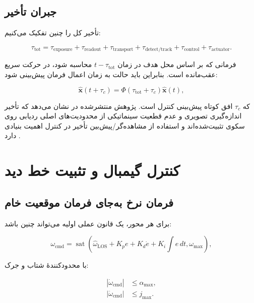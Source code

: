\documentclass[12pt,a4paper]{article}
\newcommand{\EN}[1]{\lr{#1}}
\begin{document}
\subsection{جبران تأخیر}

تأخیر کل را چنین تفکیک می‌کنیم:

\begin{equation}
\tau_{\mathrm{tot}} =
\tau_{\mathrm{exposure}}+
\tau_{\mathrm{readout}}+
\tau_{\mathrm{transport}}+
\tau_{\mathrm{detect/track}}+
\tau_{\mathrm{control}}+
\tau_{\mathrm{actuator}}.
\end{equation}

فرمانی که بر اساس محل هدف در زمان $t-\tau_{\mathrm{tot}}$ محاسبه شود، در حرکت سریع عقب‌مانده است. بنابراین باید حالت به زمان اعمال فرمان پیش‌بینی شود:

\begin{equation}
\widehat{\mathbf{x}}(t+\tau_c)=
\Phi(\tau_{\mathrm{tot}}+\tau_c)\widehat{\mathbf{x}}(t),
\end{equation}

که $\tau_c$ افق کوتاه پیش‌بینی کنترل است. پژوهش منتشرشده در \EN{Automatica} نشان می‌دهد که تأخیر اندازه‌گیری تصویری و عدم قطعیت سینماتیکی از محدودیت‌های اصلی ردیابی روی سکوی تثبیت‌شده‌اند و استفاده از مشاهده‌گر/پیش‌بین تأخیر در کنترل اهمیت بنیادی دارد \cite{yang2022}.

\section{کنترل گیمبال و تثبیت خط دید}

\subsection{فرمان نرخ به‌جای فرمان موقعیت خام}

برای هر محور، یک قانون عملی اولیه می‌تواند چنین باشد:

\begin{equation}
\omega_{\mathrm{cmd}} =
\operatorname{sat}\!\left(
\widehat{\omega}_{\mathrm{LOS}} +
K_p e + K_d\dot e + K_i\int e\,dt,
\omega_{\max}
\right),
\label{eq:control}
\end{equation}

با محدودکنندهٔ شتاب و جرک:

\begin{align}
|\dot\omega_{\mathrm{cmd}}| &\le \alpha_{\max},\\
|\ddot\omega_{\mathrm{cmd}}| &\le j_{\max}.
\end{align}
\end{document}
